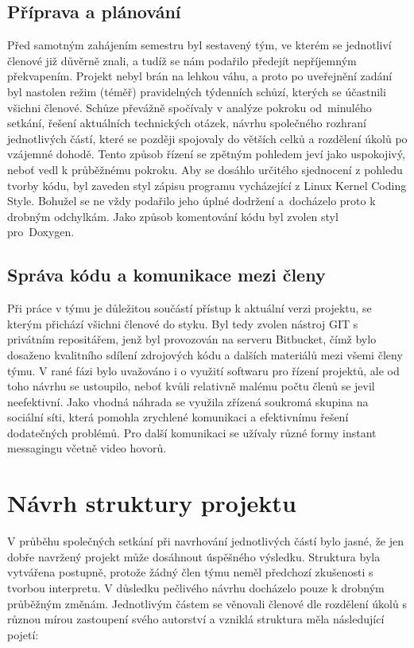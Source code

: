\documentclass[12pt,a4paper,titlepage,final]{article}
\begin{document}
\subsection{Příprava a plánování}
Před samotným zahájením semestru byl sestavený tým, ve kterém se jednotliví 
členové již důvěrně znali, a tudíž se nám podařilo předejít nepříjemným 
překvapením. Projekt nebyl brán na lehkou váhu, a proto po uveřejnění zadání 
byl nastolen režim (téměř) pravidelných týdenních schůzí, kterých se 
účastnili všichni členové. Schůze převážně spočívaly v analýze pokroku od~minulého 
setkání, řešení aktuálních technických otázek, návrhu společného 
rozhraní jednotlivých částí, které se později spojovaly do větších celků a 
rozdělení úkolů po vzájemné dohodě. Tento způsob řízení se zpětným pohledem 
jeví jako uspokojivý, neboť vedl k průběžnému pokroku. Aby se dosáhlo určitého 
sjednocení z pohledu tvorby kódu, byl zaveden styl zápisu programu 
vycházející z Linux Kernel Coding Style\cite{coding_style}. Bohužel se ne vždy 
podařilo jeho úplné dodržení a~docházelo proto k drobným odchylkám. Jako způsob 
komentování kódu byl zvolen styl pro~Doxygen.

\subsection{Správa kódu a komunikace mezi členy}
Při práce v týmu je důležitou součástí přístup k aktuální verzi projektu, 
se kterým přichází všichni členové do styku. Byl tedy zvolen nástroj GIT s 
privátním repositářem, jenž byl provozován na serveru Bitbucket, čímž bylo 
dosaženo kvalitního sdílení zdrojových kódu a dalších materiálů mezi všemi 
členy týmu. V rané fázi bylo uvažováno i o využití softwaru pro řízení 
projektů, ale od toho návrhu se ustoupilo, neboť kvůli relativně malému 
počtu členů se jevil neefektivní. Jako vhodná náhrada se využila zřízená 
soukromá skupina na sociální síti, která pomohla zrychlené komunikaci a 
efektivnímu řešení dodatečných problémů. Pro další komunikaci se užívaly 
různé formy instant messagingu včetně video hovorů.


\section{Návrh struktury projektu} \label{navrhstrukt}
V průběhu společných setkání při navrhování jednotlivých částí bylo jasné, 
že jen dobře navržený projekt může dosáhnout úspěšného výsledku. Struktura 
byla vytvářena postupně, protože žádný člen týmu neměl předchozí zkušenosti 
s tvorbou interpretu. V důsledku pečlivého návrhu docházelo pouze k drobným 
průběžným změnám. Jednotlivým částem se věnovali členové dle rozdělení úkolů 
s různou mírou zastoupení svého autorství a vzniklá struktura měla 
následující pojetí:
\end{document}
